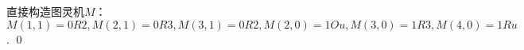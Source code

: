 \begin{pf} \rm \;
    直接构造图灵机$M$：
    $M(1, 1) = 0R2, M(2, 1) = 0R3, M(3, 1) = 0R2, M(2, 0) = 1Ou, M(3, 0) = 1R3, M(4, 0) = 1Ru$.
    \qed
\end{pf}
